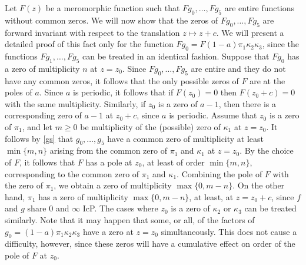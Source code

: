 \documentclass{amsart}
\theoremstyle{definition}
\numberwithin{equation}{section}
\numberwithin{theorem}{section}
\begin{document}
Let $F(z)$ be a meromorphic function such that $Fg_0,\ldots,Fg_5$ are entire functions without common zeros. We will now show that the zeros of $Fg_0,\ldots,Fg_5$ are forward invariant with respect to the translation $z\mapsto z+c$. We will present a detailed proof of this fact only for the function $Fg_0=F(1-a)\pi_1\kappa_2\kappa_3$, since the functions $Fg_1,\ldots,Fg_5$ can be treated in an identical fashion. Suppose that $Fg_0$ has a zero of multiplicity $n$ at $z=z_0$. Since $Fg_0,\ldots,Fg_5$ are entire and they do not have any common zeros, it follows that the only possible zeros of $F$ are at the poles of $a$. Since $a$ is periodic, it follows that if $F(z_0)=0$ then $F(z_0+c)=0$ with the same multiplicity. Similarly, if $z_0$ is a zero of $a-1$, then there is a corresponding zero of $a-1$ at $z_0+c$, since $a$ is periodic. Assume that $z_0$ is a zero of $\pi_1$, and let $m\geq0$ be multiplicity of the (possible) zero of $\kappa_1$ at $z=z_0$. It follows by \eqref{gs} that $g_0,\ldots,g_5$ have a common zero of multiplicity at least $\min\{m,n\}$ arising from the common zero of $\pi_1$ and $\kappa_1$ at $z=z_0$. By the choice of $F$, it follows that $F$ has a pole at $z_0$, at least of order $\min\{m,n\}$, corresponding to the common zero of $\pi_1$ and $\kappa_1$. Combining the pole of $F$ with the zero of $\pi_1$, we obtain a zero of multiplicity $\max\{0,m-n\}$. On the other hand, $\pi_1$ has a zero of multiplicity $\max\{0,m-n\}$, at least, at $z=z_0+c$, since $f$ and $g$ share $0$ and $\infty$ IcP. The cases where $z_0$ is a zero of $\kappa_2$ or $\kappa_3$ can be treated similarly. Note that it may happen that some, or all, of the factors of $g_0=(1-a)\pi_1\kappa_2\kappa_3$ have a zero at $z=z_0$ simultaneously. This does not cause a difficulty, however, since these zeros will have a cumulative effect on order of the pole of $F$ at $z_0$.
\end{document}
